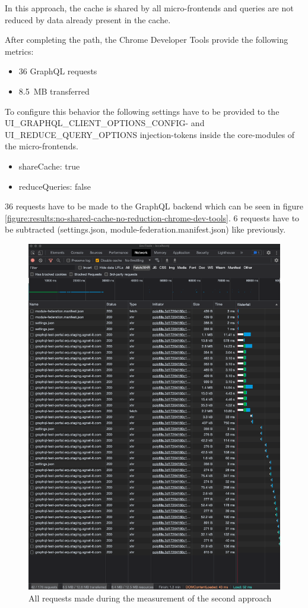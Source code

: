 In this approach, the cache is shared by all micro-frontends and queries are not reduced by data already present in the cache.

After completing the path, the Chrome Developer Tools provide the following metrics:

\begin{itemize}
    \item 36 GraphQL requests
    \item 8.5 MB transferred
\end{itemize}

 To configure this behavior the following settings have to be provided to the UI\_GRAPHQL\_CLIENT\_OPTIONS\_CONFIG- and UI\_REDUCE\_QUERY\_OPTIONS injection-tokens inside the core-modules of the micro-frontends.

\begin{itemize}
    \item shareCache: true
    \item reduceQueries: false
\end{itemize}

36 requests have to be made to the GraphQL backend which can be seen in figure \ref{figure:results:no-shared-cache-no-reduction-chrome-dev-tools}. 6 requests have to be subtracted (settings.json, module-federation.manifest.json) like previously.

\ifshowImages
\begin{figure}[H]
\centering
\includegraphics[width=0.6\linewidth]{images/1-attempt/shared-not-reduced-cache.png}
\caption{All requests made during the measurement of the second approach}\label{figure:results:shared-cache-no-reduction-chrome-dev-tools}
\end{figure}
\fi

